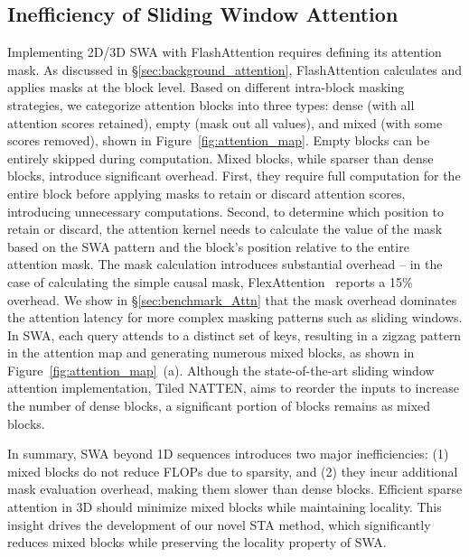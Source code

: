 \subsection{Inefficiency of Sliding Window Attention}
\label{sec:3.1}
Implementing 2D/3D SWA with FlashAttention requires defining its attention mask. As discussed in  \S\ref{sec:background_attention}, FlashAttention calculates and applies masks at the block level. Based on different intra-block masking strategies, we categorize attention blocks into three types:
dense (with all attention scores retained), empty (mask out all values), and mixed (with some scores removed), shown in Figure~\ref{fig:attention_map}.
Empty blocks can be entirely skipped during computation. Mixed blocks, while sparser than dense blocks, introduce significant overhead.  First, they require full computation for the entire block before applying masks to retain or discard attention scores, introducing unnecessary computations.
Second, to determine which position to retain or discard, the attention kernel needs to calculate the value of the mask based on the SWA pattern and the block's position relative to the entire attention mask. The mask calculation introduces substantial overhead -- in the case of calculating the simple causal mask, FlexAttention~\citep{dong2024flexattentionprogrammingmodel} reports a 15\% overhead. We show in  \S\ref{sec:benchmark_Attn} that the mask overhead dominates the attention latency for more complex masking patterns such as sliding windows. In SWA, each query attends to a distinct set of keys, resulting in a zigzag pattern in the attention map and generating numerous mixed blocks, as shown in Figure~\ref{fig:attention_map}~(a). Although the state-of-the-art sliding window attention implementation, Tiled NATTEN, aims to reorder the inputs to increase the number of dense blocks, a significant portion of blocks remains as mixed blocks. 

In summary, SWA beyond 1D sequences introduces two major inefficiencies: (1) mixed blocks do not reduce FLOPs due to sparsity, and (2) they incur additional mask evaluation overhead, making them slower than dense blocks.  
Efficient sparse attention in 3D should minimize mixed blocks while maintaining locality. This insight drives the development of our novel STA method, which significantly reduces mixed blocks while preserving the locality property of SWA.


